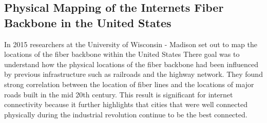 \subsection{Physical Mapping of the Internets Fiber Backbone in the United States}
In 2015 researchers at the University of Wisconsin - Madison set out to map the locations of the fiber backbone within the United States  There goal was to understand how the physical locations of the fiber backbone had been influenced by previous infrastructure such as railroads and the highway network. They found strong correlation between the location of fiber lines and the locations of major roads built in the mid 20th century. This result is significant for internet connectivity because it further highlights that cities that were well connected physically during the industrial revolution  continue to be the best connected. 
 